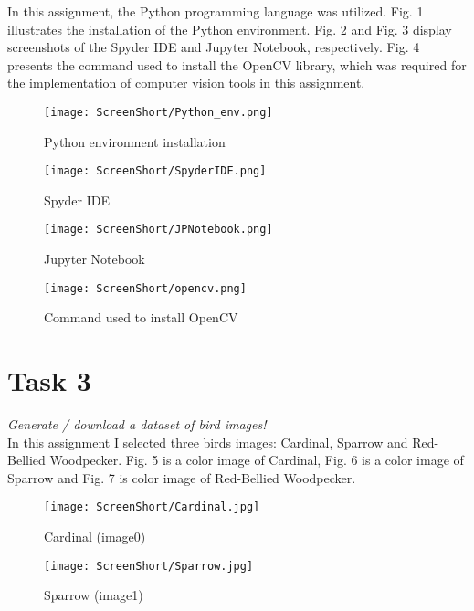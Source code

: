 \documentclass[conference,12pt]{IEEEtran}
\begin{document}
In this assignment, the Python programming language was utilized. Fig. 1 illustrates the installation of the Python environment. Fig. 2 and Fig. 3 display screenshots of the Spyder IDE and Jupyter Notebook, respectively. Fig. 4 presents the command used to install the OpenCV library, which was required for the implementation of computer vision tools in this assignment.

\begin{figure}[h]
    \centering
    \texttt{[image: ScreenShort/Python\_env.png]}
    \caption{Python environment installation}
\end{figure}

\begin{figure}[h]
    \centering
    \texttt{[image: ScreenShort/SpyderIDE.png]}
    \caption{Spyder IDE}
\end{figure}

\begin{figure}[h]
    \centering
    \texttt{[image: ScreenShort/JPNotebook.png]}
    \caption{Jupyter Notebook}
\end{figure}


\begin{figure}[h]
    \centering
    \texttt{[image: ScreenShort/opencv.png]}
    \caption{Command used to install OpenCV}
\end{figure}

\section{Task 3}
\textit{Generate / download a dataset of bird images!}\\
    In this assignment I selected three birds images: Cardinal, Sparrow and 
Red-Bellied Woodpecker. Fig. 5 is a color image of Cardinal, Fig. 6 is a color image of Sparrow and Fig. 7 is color image of Red-Bellied Woodpecker.


\begin{figure}[h]
    \centering
    \texttt{[image: ScreenShort/Cardinal.jpg]}
    \caption{Cardinal (image0)}
\end{figure}

\begin{figure}[h]
    \centering
    \texttt{[image: ScreenShort/Sparrow.jpg]}
    \caption{Sparrow (image1)}
\end{figure}
\end{document}
